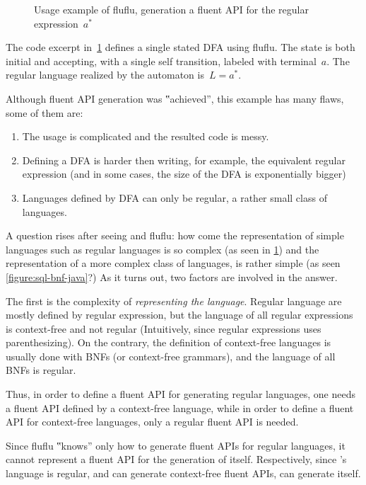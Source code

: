 \begin{figure}[ht]
  \caption{\label{figure:fluflu}
    Usage example of fluflu, generation a fluent
  API for the regular expression~\texorpdfstring{$a^*$}{a*}}
\end{figure}
The code excerpt in~\cref{figure:fluflu} defines a single stated DFA using
fluflu. The state is both initial and accepting, with a single self
transition, labeled with terminal~$a$. The regular language realized by the
automaton is~$L=a^*$.

Although fluent API generation was ‟achieved”, this example has many flaws, some of them are:

\begin{enumerate}
  \item The usage is complicated and the resulted code is messy.
  \item Defining a DFA is harder then writing, for example, the equivalent regular
        expression (and in some cases, the size of the DFA is exponentially bigger)
  \item Languages defined by DFA can only be regular, a rather small
        class of languages.
\end{enumerate}

A question rises after seeing \Fajita and fluflu: how come the representation
of simple languages such as regular languages is so complex (as seen in
\cref{figure:fluflu}) and the representation of a more complex class of
languages, is rather simple (as seen \cref{figure:sql-bnf-java}?) As it turns
out, two factors are involved in the answer.

The first is the complexity of \emph{representing the language}.
Regular language are mostly defined by regular expression, but the language of
all regular expressions is context-free and not regular
(Intuitively, since regular expressions uses parenthesizing). On the contrary,
the definition of context-free languages is usually done with BNFs (or 
context-free grammars), and the language of all BNFs is regular.

Thus, in order to define a fluent API for generating regular languages, one needs a
fluent API defined by a context-free language, while in order to define a fluent API for
context-free languages, only a regular fluent API is needed.

Since fluflu ‟knows” only how to generate fluent APIs for regular languages,
it cannot represent a fluent API for the generation of itself.
Respectively, since \Fajita's language is regular, and can generate context-free
  fluent APIs, \Fajita can generate itself.

